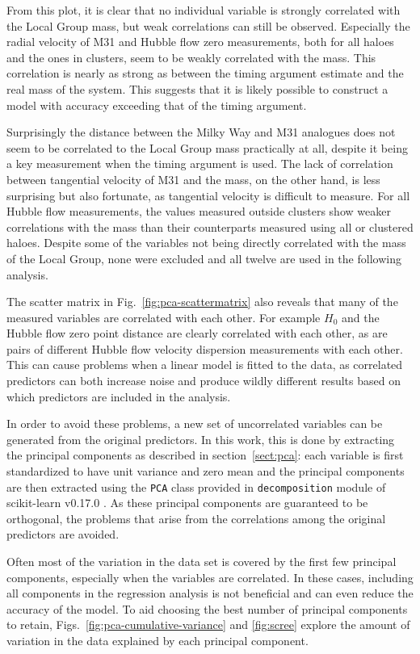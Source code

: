 \documentclass[english, oneside]{HYgradu}
\begin{document}
From this plot, it is clear that no individual variable is strongly correlated with the Local Group mass, but weak correlations can still be observed. Especially the radial velocity of M31 and Hubble flow zero measurements, both for all haloes and the ones in clusters, seem to be weakly correlated with the mass. This correlation is nearly as strong as between the timing argument estimate and the real mass of the system. This suggests that it is likely possible to construct a model with accuracy exceeding that of the timing argument.

Surprisingly the distance between the Milky Way and M31 analogues does not seem to be correlated to the Local Group mass practically at all, despite it being a key measurement when the timing argument is used. The lack of correlation between tangential velocity of M31 and the mass, on the other hand, is less surprising but also fortunate, as tangential velocity is difficult to measure. For all Hubble flow measurements, the values measured outside clusters show weaker correlations with the mass than their counterparts measured using all or clustered haloes. Despite some of the variables  not being directly correlated with the mass of the Local Group, none were excluded and all twelve are used in the following analysis.

The scatter matrix in Fig.~\ref{fig:pca-scattermatrix} also reveals that many of the measured variables are correlated with each other. For example $H_0$ and the Hubble flow zero point distance are clearly correlated with each other, as are pairs of different Hubble flow velocity dispersion measurements with each other. This can cause problems when a linear model is fitted to the data, as correlated predictors can both increase noise and produce wildly different results based on which predictors are included in the analysis. 

In order to avoid these problems, a new set of uncorrelated variables can be generated from the original predictors. In this work, this is done by extracting the principal components as described in section~\ref{sect:pca}: each variable is first standardized to have unit variance and zero mean and the principal components are then extracted using the \texttt{PCA} class provided in \texttt{decomposition} module of scikit-learn v0.17.0 \citep{scikit-learn}. As these principal components are guaranteed to be orthogonal, the problems that arise from the correlations among the original predictors are avoided.

Often most of the variation in the data set is covered by the first few principal components, especially when the variables are correlated. In these cases, including all components in the regression analysis is not beneficial and can even reduce the accuracy of the model. To aid choosing the best number of principal components to retain, Figs.~\ref{fig:pca-cumulative-variance} and \ref{fig:scree} explore the amount of variation in the data explained by each principal component.
\end{document}
